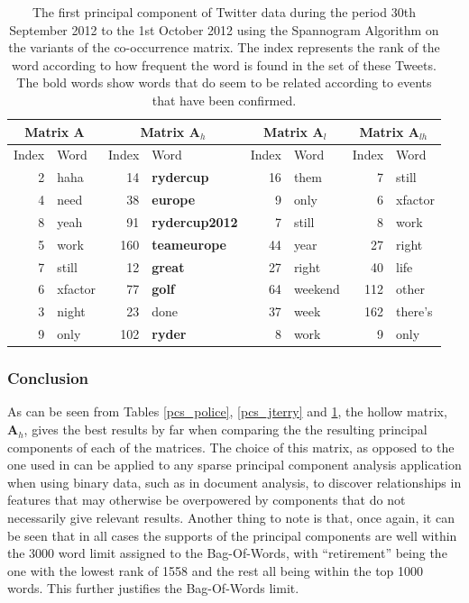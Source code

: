\documentclass[11pt,a4paper]{article}
\newcommand{\covmat}{\mathbf{A}}
\begin{document}
\begin{table}[H]
\center
\begin{tabular}{| r | l | r | l| r | l | r | l|}
\hline
\multicolumn{2}{|c|}{Matrix $\covmat$ }& \multicolumn{2}{|c|}{Matrix $\covmat_h$}& \multicolumn{2}{|c|}{Matrix $\covmat_l$} & \multicolumn{2}{|c|}{Matrix $\covmat_{lh}$} \\

\hline
Index & Word &Index & Word & Index & Word & Index & Word\\
\hline
2 & haha & 14 & \textbf{rydercup} & 16 & them& 7 & still\\
4 & need  & 38 & \textbf{europe} & 9 & only &  6 & xfactor\\
8 & yeah &91 & \textbf{rydercup2012}& 7 & still  & 8 & work \\

5 & work & 160 & \textbf{teameurope}&44 & year  & 27 & right \\

7 & still &  12 & \textbf{great}&27 & right   & 40 & life\\

6 & xfactor & 77 & \textbf{golf}  &64& weekend & 112 & other  \\ 

3 & night &23 & done & 37 & week & 162 & there's\\
 
9 & only & 102 & \textbf{ryder}  & 8 & work & 9 & only\\

\hline
\end{tabular}
\label{pcs_ryder}
\caption{The first principal component of Twitter data during the period 30th September 2012 to the 1st October 2012 using the Spannogram Algorithm on the variants of the co-occurrence matrix. The index represents the rank of the word according to how frequent the word is found in the set of these Tweets. The bold words show words that do seem to be related according to events that have been confirmed.}
\end{table}

\subsubsection*{Conclusion}
As can be seen from Tables \ref{pcs_police}, \ref{pcs_jterry} and \ref{pcs_ryder}, the hollow matrix, $\covmat_h$, gives the best results by far when comparing the the resulting principal components of each of the matrices. The choice of this matrix, as opposed to the one used in \cite{dimakis} can be applied to any sparse principal component analysis application when using binary data, such as in document analysis, to discover relationships in features that may otherwise be overpowered by components that do not necessarily give relevant results. Another thing to note is that, once again, it can be seen that in all cases the supports of the principal components are well within the 3000 word limit assigned to the Bag-Of-Words, with ``retirement'' being the one with the lowest rank of 1558 and the rest all being within the top 1000 words. This further justifies the Bag-Of-Words limit. 
\end{document}
